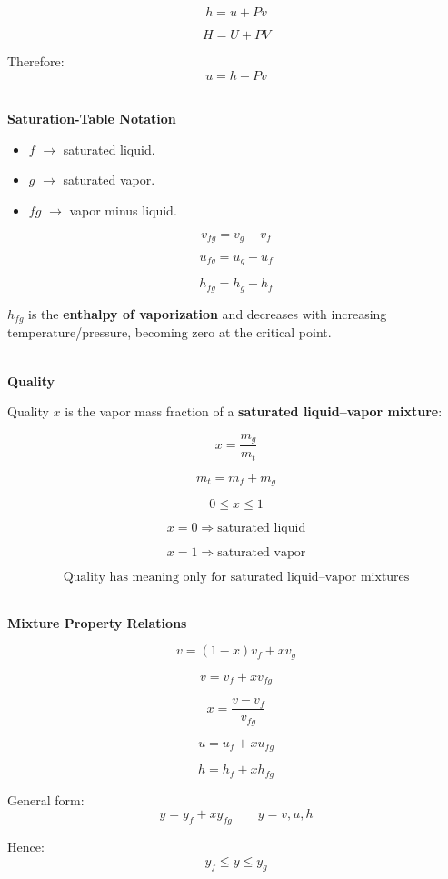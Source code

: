 \documentclass[12pt]{article}
\begin{document}
\[
\boxed{h=u+Pv}
\]

\[
\boxed{H=U+PV}
\]

Therefore:
\[
\boxed{u=h-Pv}
\]

\textbf{\\ Saturation-Table Notation}

\begin{itemize}[leftmargin=*]
    \item $f$ $\rightarrow$ saturated liquid.
    \item $g$ $\rightarrow$ saturated vapor.
    \item $fg$ $\rightarrow$ vapor minus liquid.
\end{itemize}

\[
\boxed{v_{fg}=v_g-v_f}
\]

\[
\boxed{u_{fg}=u_g-u_f}
\]

\[
\boxed{h_{fg}=h_g-h_f}
\]

$h_{fg}$ is the \textbf{enthalpy of vaporization} and decreases with increasing temperature/pressure, becoming zero at the critical point.

\textbf{\\ Quality}

Quality $x$ is the vapor mass fraction of a \textbf{saturated liquid--vapor mixture}:

\[
\boxed{x=\frac{m_g}{m_t}}
\]

\[
m_t=m_f+m_g
\]

\[
\boxed{0\leq x\leq1}
\]

\[
x=0\Rightarrow\text{saturated liquid}
\]

\[
x=1\Rightarrow\text{saturated vapor}
\]

\[
\boxed{\text{Quality has meaning only for saturated liquid--vapor mixtures}}
\]

\textbf{\\ Mixture Property Relations}

\[
v=(1-x)v_f+xv_g
\]

\[
\boxed{v=v_f+xv_{fg}}
\]

\[
\boxed{x=\frac{v-v_f}{v_{fg}}}
\]

\[
\boxed{u=u_f+xu_{fg}}
\]

\[
\boxed{h=h_f+xh_{fg}}
\]

General form:
\[
\boxed{y=y_f+xy_{fg}}
\qquad
y=v,u,h
\]

Hence:
\[
\boxed{y_f\leq y\leq y_g}
\]
\end{document}
